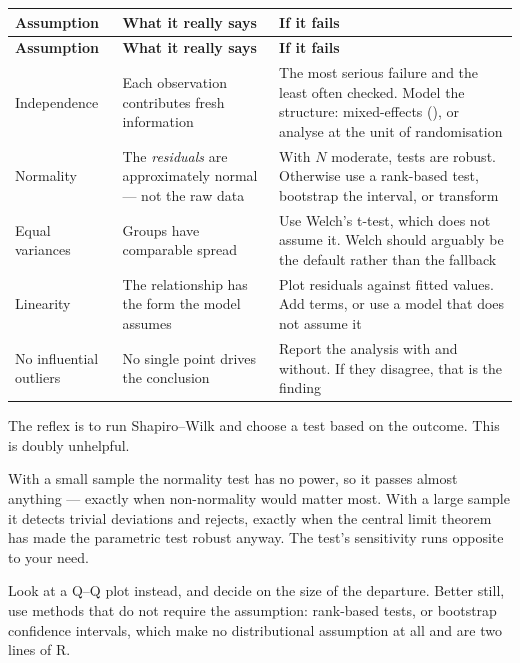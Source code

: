 \begin{center}
\small
\begin{longtable}{@{}L{2.8cm}L{5.0cm}L{6.4cm}@{}}
\toprule
\textbf{Assumption} & \textbf{What it really says} & \textbf{If it fails} \\
\midrule
\endfirsthead
\toprule
\textbf{Assumption} & \textbf{What it really says} & \textbf{If it fails} \\
\midrule
\endhead
\bottomrule
\endfoot
Independence
  & Each observation contributes fresh information
  & The most serious failure and the least often checked. Model the structure:
    mixed-effects (), or analyse at the unit of randomisation \\
Normality
  & The \emph{residuals} are approximately normal --- not the raw data
  & With $N$ moderate, tests are robust. Otherwise use a rank-based test,
    bootstrap the interval, or transform \\
Equal variances
  & Groups have comparable spread
  & Use Welch's t-test, which does not assume it. Welch should arguably be the
    default rather than the fallback \\
Linearity
  & The relationship has the form the model assumes
  & Plot residuals against fitted values. Add terms, or use a model that does
    not assume it \\
No influential outliers
  & No single point drives the conclusion
  & Report the analysis with and without. If they disagree, that is the finding \\
\end{longtable}
\end{center}

\begin{pitfall}
The reflex is to run Shapiro--Wilk and choose a test based on the outcome. This
is doubly unhelpful.

\medskip
With a small sample the normality test has no power, so it passes almost
anything --- exactly when non-normality would matter most. With a large sample
it detects trivial deviations and rejects, exactly when the central limit
theorem has made the parametric test robust anyway. The test's sensitivity runs
opposite to your need.

\medskip
Look at a Q--Q plot instead, and decide on the size of the departure. Better
still, use methods that do not require the assumption: rank-based tests, or
bootstrap confidence intervals, which make no distributional assumption at all
and are two lines of R.
\end{pitfall}

